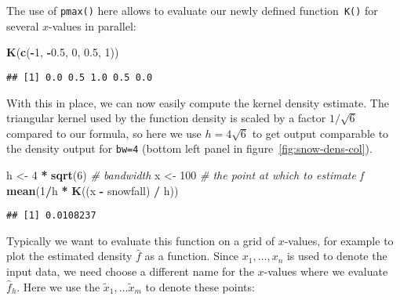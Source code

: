 \documentclass[
  a4paper,
]{article}
\newenvironment{Shaded}{\begin{snugshade}}{\end{snugshade}}
\newcommand{\CommentTok}[1]{\textcolor[rgb]{0.56,0.35,0.01}{\textit{#1}}}
\newcommand{\DecValTok}[1]{\textcolor[rgb]{0.00,0.00,0.81}{#1}}
\newcommand{\FloatTok}[1]{\textcolor[rgb]{0.00,0.00,0.81}{#1}}
\newcommand{\FunctionTok}[1]{\textcolor[rgb]{0.13,0.29,0.53}{\textbf{#1}}}
\newcommand{\NormalTok}[1]{#1}
\newcommand{\OtherTok}[1]{\textcolor[rgb]{0.56,0.35,0.01}{#1}}
\newcommand{\SpecialCharTok}[1]{\textcolor[rgb]{0.81,0.36,0.00}{\textbf{#1}}}
\theoremstyle{definition}
\theoremstyle{definition}
\theoremstyle{definition}
\theoremstyle{definition}
\theoremstyle{remark}
\begin{document}
The use of \texttt{pmax()} here allows to evaluate our newly defined function~\texttt{K()}
for several \(x\)-values in parallel:

\begin{Shaded}
\begin{Highlighting}[]
\FunctionTok{K}\NormalTok{(}\FunctionTok{c}\NormalTok{(}\SpecialCharTok{{-}}\DecValTok{1}\NormalTok{, }\SpecialCharTok{{-}}\FloatTok{0.5}\NormalTok{, }\DecValTok{0}\NormalTok{, }\FloatTok{0.5}\NormalTok{, }\DecValTok{1}\NormalTok{))}
\end{Highlighting}
\end{Shaded}

\begin{verbatim}
## [1] 0.0 0.5 1.0 0.5 0.0
\end{verbatim}

With this in place, we can now easily compute the kernel density estimate.
The triangular kernel used by the function density is scaled by a factor
\(1/\sqrt{6}\) compared to our formula, so here we use \(h = 4\sqrt{6}\)
to get output comparable to the density output for \texttt{bw=4} (bottom left
panel in figure~\ref{fig:snow-dens-col}).

\begin{Shaded}
\begin{Highlighting}[]
\NormalTok{h }\OtherTok{\textless{}{-}} \DecValTok{4} \SpecialCharTok{*} \FunctionTok{sqrt}\NormalTok{(}\DecValTok{6}\NormalTok{) }\CommentTok{\# bandwidth}
\NormalTok{x }\OtherTok{\textless{}{-}} \DecValTok{100} \CommentTok{\# the point at which to estimate f}
\FunctionTok{mean}\NormalTok{(}\DecValTok{1}\SpecialCharTok{/}\NormalTok{h }\SpecialCharTok{*} \FunctionTok{K}\NormalTok{((x }\SpecialCharTok{{-}}\NormalTok{ snowfall) }\SpecialCharTok{/}\NormalTok{ h))}
\end{Highlighting}
\end{Shaded}

\begin{verbatim}
## [1] 0.0108237
\end{verbatim}

Typically we want to evaluate this function on a grid of \(x\)-values,
for example to plot the estimated density \(\hat f\) as a function.
Since \(x_1, \ldots, x_n\) is used to denote the input data, we need
choose a different name for the \(x\)-values where we evaluate \(\hat f_h\).
Here we use the \(\tilde x_1, \ldots \tilde x_m\) to denote these points:
\end{document}
